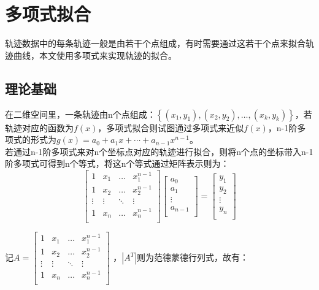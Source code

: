 \section{多项式拟合}
轨迹数据中的每条轨迹一般是由若干个点组成，有时需要通过这若干个点来拟合轨迹曲线，本文使用多项式来实现轨迹的拟合。
\subsection{理论基础}
在二维空间里，一条轨迹由n个点组成：$\left\{\left(x_{1}, y_{1}\right),\left(x_{2}, y_{2}\right), \dots,\left(x_{k}, y_{k}\right)\right\}$，若轨迹对应的函数为$f(x)$，多项式拟合则试图通过多项式来近似$f(x)$，n-1阶多项式的形式为$g\left( x \right) =a_0+a_1x+\cdots +a_{n-1}x^{n-1}$。\\
若通过n-1阶多项式来对n个坐标点对应的轨迹进行拟合，则将n个点的坐标带入n-1阶多项式可得到n个等式，将这n个等式通过矩阵表示则为：
\begin{equation}
\label{vandermonde}
\left[ \begin{matrix}
	1&		x_1&		\dots&		x_{1}^{n-1}\\
	1&		x_2&		\dots&		x_{2}^{n-1}\\
	\vdots&		\vdots&		\ddots&		\vdots\\
	1&		x_n&		\dots&		x_{n}^{n-1}\\
\end{matrix} \right] \left[ \begin{array}{c}
	a_0\\
	a_1\\
	\vdots\\
	a_{n-1}\\
\end{array} \right] =\left[ \begin{array}{c}
	y_1\\
	y_2\\
	\vdots\\
	y_n\\
\end{array} \right] 
\end{equation}

记$A=\left[ \begin{matrix}
	1&		x_1&		\dots&		x_{1}^{n-1}\\
	1&		x_2&		\dots&		x_{2}^{n-1}\\
	\vdots&		\vdots&		\ddots&		\vdots\\
	1&		x_n&		\dots&		x_{n}^{n-1}\\
\end{matrix} \right] $
，$\left|A^{T}\right|$则为范德蒙德行列式，故有：

